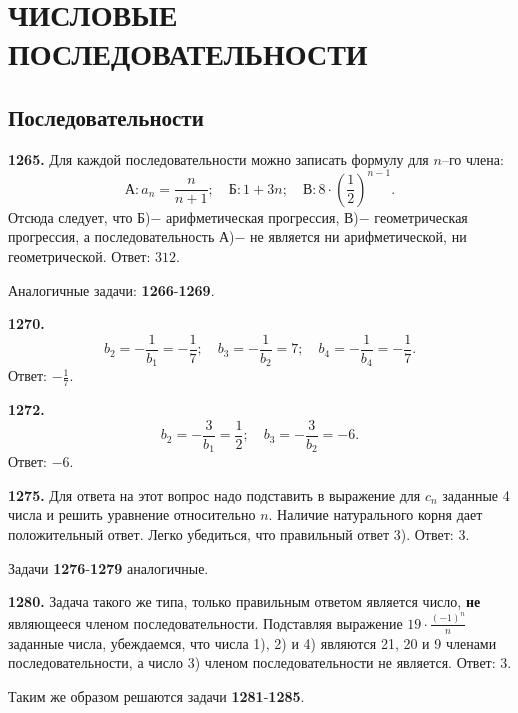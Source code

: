 \section{ЧИСЛОВЫЕ ПОСЛЕДОВАТЕЛЬНОСТИ}
\subsection{Последовательности}


\textbf{1265.}  Для каждой  последовательности можно записать формулу для $n$–го члена: $$\text{А}: a_n=\frac{n}{n+1};\quad \text{Б}: 1+3n;\quad \text{В}: 8\cdot\left(\frac{1}{2}\right)^{n-1}.$$
Отсюда следует, что Б)$-$ арифметическая прогрессия,  В)$-$ геометрическая прогрессия, а последовательность А)$-$ не является ни арифметической, ни геометрической. \newline \null \hspace*{\fill} Ответ: $312$. 

Аналогичные задачи: \textbf{1266}-\textbf{1269}.

\textbf{1270.} $$b_2=-\frac{1}{b_1}=-\frac{1}{7};\quad b_3=-\frac{1}{b_2}=7;\quad b_4=-\frac{1}{b_4}=-\frac{1}{7}.$$ \newline \null \hspace*{\fill} Ответ: $-\frac{1}{7}$. 

\textbf{1272.} $$b_2=-\frac{3}{b_1}=\frac{1}{2};\quad b_3=-\frac{3}{b_2}=-6.$$ \newline \null \hspace*{\fill} Ответ: $-6$. 

\textbf{1275.} Для ответа на этот вопрос надо подставить в выражение для $c_n$ заданные 4 числа и решить уравнение относительно $n$. Наличие натурального корня дает положительный ответ. Легко убедиться, что правильный ответ 3). \newline \null \hspace*{\fill} Ответ: 3. 

Задачи \textbf{1276}-\textbf{1279} аналогичные.

\textbf{1280.} Задача такого же типа, только правильным ответом является число, \textbf{не} являющееся членом последовательности. Подставляя выражение $19\cdot\frac{\left(-1\right)^n}{n}$ заданные числа, убеждаемся, что числа 1), 2) и 4) являются 21, 20 и 9 членами последовательности, а число 3) членом последовательности не является. \newline \null \hspace*{\fill} Ответ: 3.  

Таким же образом решаются задачи \textbf{1281}-\textbf{1285}.

